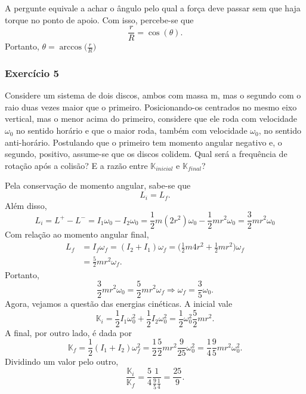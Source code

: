 \documentclass[physicsII_notes.tex]{subfiles}
\begin{document}
A pergunte equivale a achar o ângulo pelo qual a força deve passar sem que haja torque no ponto de apoio. Com isso, percebe-se que
\[
	\frac{r}{R} = \cos{(\theta )}.
\]
Portanto, \(\theta = \arccos{\biggl(\frac{r}{R}\biggr)}\)
\subsubsection{Exercício 5}
Considere um sistema de dois discos, ambos com massa m, mas o segundo com o raio duas vezes maior que o primeiro. Posicionando-os centrados no mesmo eixo vertical, mas
o menor acima do primeiro, considere que ele roda com velocidade \(\omega_{0}\) no sentido horário e que o maior roda, também com velocidade \(\omega_{0}\), no sentido anti-horário.
Postulando que o primeiro tem momento angular negativo e, o segundo, positivo, assume-se que os discos colidem. Qual será a frequência de rotação após a colisão?
E a razão entre \(\mathbb{K}_{inicial}\) e \(\mathbb{K}_{final}\)?

Pela conservação de momento angular, sabe-se que
\[
	L_{i} = L_{f}.
\]
Além disso,
\[
	L_{i} = L^{+}-L^{-} = I_{1}\omega_{0} - I_{2}\omega_{0} = \frac{1}{2}m(2r^{2})\omega_{0} - \frac{1}{2}mr^{2}\omega_{0} = \frac{3}{2}mr^{2}\omega_{0}
\]
Com relação ao momento angular final,
\begin{align*}
	L_{f} & = I_{f}\omega_{f} = (I_{2} + I_{1})\omega_{f} = \biggl(\frac{1}{2}m4r^{2}+\frac{1}{2}mr^{2}\biggr)\omega_{f} \\
	      & =\frac{5}{2}mr^{2}\omega_{f}.
\end{align*}
Portanto,
\[
	\frac{3}{2}mr^{2}\omega_{0} = \frac{5}{2}mr^{2}\omega_{f} \Rightarrow \omega_{f}=\frac{3}{5}\omega_{0}.
\]
Agora, vejamos a questão das energias cinéticas. A inicial vale
\[
	\mathbb{K}_{i} = \frac{1}{2}I_{1}\omega_{0}^{2} + \frac{1}{2}I_{2}\omega_{0}^{2} = \frac{1}{2}\omega_{0}^{2}\frac{5}{2}mr^{2}.
\]
A final, por outro lado, é dada por
\[
	\mathbb{K}_{f} = \frac{1}{2}(I_{1}+I_{2})\omega_{f}^{2} = \frac{1}{2}\frac{5}{2}mr^{2}\frac{9}{25}\omega_{0}^{2} = \frac{1}{4}\frac{9}{5}mr^{2}\omega_{0}^{2}.
\]
Dividindo um valor pelo outro,
\[
	\frac{\mathbb{K}_{i}}{\mathbb{K}_{f}} = \frac{5}{4}\frac{1}{\frac{9}{5}\frac{1}{4}} = \frac{25}{9}.
\]
\end{document}
